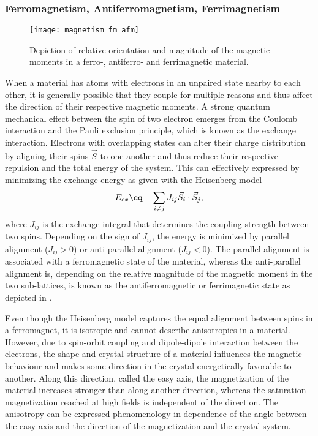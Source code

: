 \documentclass[\main/dresen_thesis.tex]{subfiles}
\begin{document}
  \subsubsection{Ferromagnetism, Antiferromagnetism, Ferrimagnetism}
    \begin{figure}[tb]
      \centering
      \texttt{[image: magnetism\_fm\_afm]}
      \caption{\label{fig:theoreticalBackground:magnetism:fm_afm_fim}Depiction of relative orientation and magnitude of the magnetic moments in a ferro-, antiferro- and ferrimagnetic material.}
    \end{figure}

    When a material has atoms with electrons in an unpaired state nearby to each other, it is generally possible that they couple for multiple reasons and thus affect the direction of their respective magnetic moments.
    A strong quantum mechanical effect between the spin of two electron emerges from the Coulomb interaction and the Pauli exclusion principle, which is known as the exchange interaction.
    Electrons with overlapping states can alter their charge distribution by aligning their spins $\vec{S}$ to one another and thus reduce their respective repulsion and the total energy of the system.
    This can effectively expressed by minimizing the exchange energy as given with the Heisenberg model
    \begin{align}
      E_{ex} \eq -\sum_{i \neq j} J_{ij} \vec{S}_i \cdot \vec{S}_j,
    \end{align}
    where $J_{ij}$ is the exchange integral that determines the coupling strength between two spins.
    Depending on the sign of $J_{ij}$, the energy is minimized by parallel alignment ($J_{ij} > 0$) or anti-parallel alignment ($J_{ij} < 0$).
    The parallel alignment is associated with a ferromagnetic state of the material, whereas the anti-parallel alignment is, depending on the relative magnitude of the magnetic moment in the two sub-lattices, is known as the antiferromagnetic or ferrimagnetic state as depicted in .

    Even though the Heisenberg model captures the equal alignment between spins in a ferromagnet, it is isotropic and cannot describe anisotropies in a material.
    However, due to spin-orbit coupling and dipole-dipole interaction between the electrons, the shape and crystal structure of a material influences the magnetic behaviour and makes some direction in the crystal energetically favorable to another.
    Along this direction, called the easy axis, the magnetization of the material increases stronger than along another direction, whereas the saturation magnetization reached at high fields is independent of the direction.
    The anisotropy can be expressed phenomenology in dependence of the angle between the easy-axis and the direction of the magnetization and the crystal system.
\end{document}
